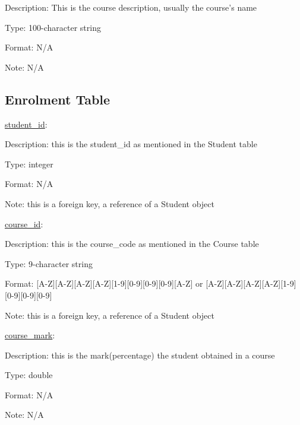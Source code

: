 \documentclass[10pt]{article}
\begin{document}
\begin{description}[font=$\bullet$~\normalfont\scshape\color{red!50!black}]
\item [] Description: This is the course description, usually the course’s name
\item [] Type: 100-character string
\item [] Format: N/A
\item [] Note: N/A
\end{description}

\subsection{Enrolment Table}

\underline{student\_id}:

\begin{description}[font=$\bullet$~\normalfont\scshape\color{red!50!black}]

\item [] Description: this is the student\_id as mentioned in the Student table
\item [] Type: integer
\item [] Format: N/A
\item [] Note: this is a foreign key, a reference of a Student object
\end{description}
\underline{course\_id}:

\begin{description}[font=$\bullet$~\normalfont\scshape\color{red!50!black}]

\item [] Description: this is the course\_code as mentioned in the Course table
\item [] Type: 9-character string
\item [] Format: [A-Z][A-Z][A-Z][A-Z][1-9][0-9][0-9][0-9][A-Z] or  [A-Z][A-Z][A-Z][A-Z][1-9][0-9][0-9][0-9]
\item [] Note: this is a foreign key, a reference of a Student object

\end{description}
\underline{course\_mark}:

\begin{description}[font=$\bullet$~\normalfont\scshape\color{red!50!black}]

\item [] Description: this is the mark(percentage) the student obtained in a course
\item [] Type:  double
\item [] Format: N/A
\item [] Note: N/A

\end{description}
\end{document}
